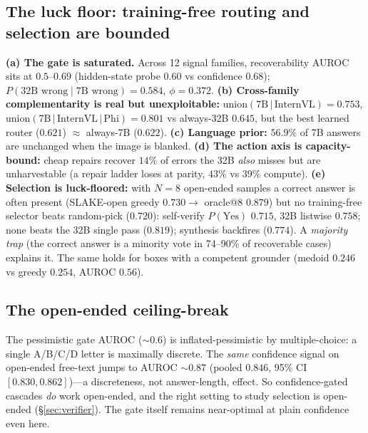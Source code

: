 \documentclass[conference]{IEEEtran}
\begin{document}
\subsection{The luck floor: training-free routing and selection are bounded}
\textbf{(a) The gate is saturated.} Across 12 signal families, recoverability AUROC sits at $0.5$--$0.69$ (hidden-state probe $0.60$ vs confidence $0.68$); $P(\text{32B wrong}\mid\text{7B wrong}){=}0.584$, $\phi{=}0.372$. \textbf{(b) Cross-family complementarity is real but unexploitable:} $\mathrm{union}(\text{7B}\,|\,\text{InternVL}){=}0.753$, $\mathrm{union}(\text{7B}\,|\,\text{InternVL}\,|\,\text{Phi}){=}0.801$ vs always-32B $0.645$, but the best learned router ($0.621$) ${\approx}$ always-7B ($0.622$). \textbf{(c) Language prior:} $56.9\%$ of 7B answers are unchanged when the image is blanked. \textbf{(d) The action axis is capacity-bound:} cheap repairs recover $14\%$ of errors the 32B \emph{also} misses but are unharvestable (a repair ladder loses at parity, $43\%$ vs $39\%$ compute). \textbf{(e) Selection is luck-floored:} with $N{=}8$ open-ended samples a correct answer is often present (SLAKE-open greedy $0.730\to$ oracle@8 $0.879$) but no training-free selector beats random-pick ($0.720$): self-verify $P(\text{Yes})$ $0.715$, 32B listwise $0.758$; none beats the 32B single pass ($0.819$); synthesis backfires ($0.774$). A \emph{majority trap} (the correct answer is a minority vote in 74--90\% of recoverable cases) explains it. The same holds for boxes with a competent grounder (medoid $0.246$ vs greedy $0.254$, AUROC $0.56$).

\subsection{The open-ended ceiling-break}
The pessimistic gate AUROC (${\sim}0.6$) is inflated-pessimistic by multiple-choice: a single A/B/C/D letter is maximally discrete. The \emph{same} confidence signal on open-ended free-text jumps to AUROC ${\sim}0.87$ (pooled $0.846$, 95\% CI $[0.830,0.862]$)---a discreteness, not answer-length, effect. So confidence-gated cascades \emph{do} work open-ended, and the right setting to study selection is open-ended (\S\ref{sec:verifier}). The gate itself remains near-optimal at plain confidence even here.
\end{document}
